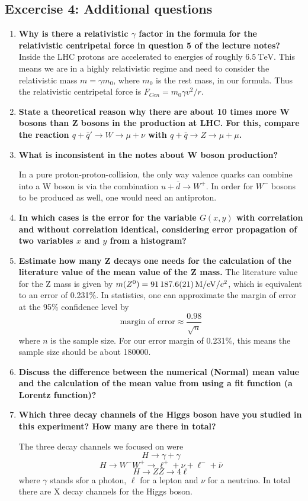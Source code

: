 \documentclass[a4paper,10pt]{article}
\begin{document}
\subsection{Excercise 4: Additional questions}

\begin{enumerate}
\item \textbf{Why is there a relativistic $\gamma$ factor in the formula for the relativistic centripetal force in question 5 of the lecture notes?}
Inside the LHC protons are accelerated to energies of roughly $\SI{6.5}{\tera\eV}$. This means we are in a highly relativistic regime and need to consider the relativistic mass $m= \gamma m_0$, where $m_0$ is the rest mass, in our formula. Thus the relativistic centripetal force is $F_{Cen} = m_0 \gamma v^2/r$.

\item \textbf{State a theoretical reason why there are about 10 times more W bosons than Z bosons in the production at LHC. For this, compare the reaction $q + \bar{q}' \to W \to \mu + \nu$ with $q + \bar{q} \to Z \to \mu + \mu$.}
\item \textbf{What is inconsistent in the notes about W boson production?}

In a pure proton-proton-collision, the only way valence quarks can combine into a W boson is via the combination $u + \bar{d} \to W^+$. In order for $W^-$ bosons to be produced as well, one would need an antiproton.
\item \textbf{In which cases is the error for the variable $G(x,y)$ with correlation and without correlation identical, considering error propagation of two variables $x$ and $y$ from a histogram?}
\item \textbf{Estimate how many Z decays one needs for the calculation of the literature value of the mean value of the Z mass.}
The literature value for the Z mass is given by $m(Z^0) = \SI{91187.6 \pm 2.1}{\mega/\eV}/c^2$, which is equivalent to an error of 0.231\%. In statistics, one can approximate the margin of error at the 95\% confidence level by
\[\text{margin of error} \approx \frac{0.98}{\sqrt{n}}\]
where $n$ is the sample size. For our error margin of 0.231\%, this means the sample size should be about 180000. 
\item \textbf{Discuss the difference between the numerical (Normal) mean value and the calculation of the mean value from using a fit function (a Lorentz function)?}
\item \textbf{Which three decay channels of the Higgs boson have you studied in this experiment? How many are there in total?}

The three decay channels we focused on were
\[H \to \gamma + \gamma\]
\[ H \to W^- W^+ \to \ell^+ + \nu + \ell^- + \bar{\nu}\]
\[ H \to ZZ \to 4 \ell\]
where $\gamma$ stands sfor a photon, $\ell$ for a lepton and $\nu$ for a neutrino. In total there are X decay channels for the Higgs boson.
\end{enumerate}
\end{document}
